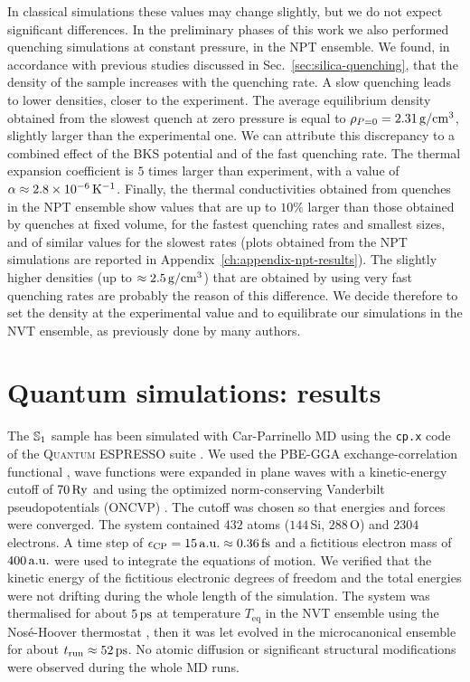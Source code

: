 In classical simulations these values may change slightly, but we do not expect significant differences. 
In the preliminary phases of this work we also performed quenching simulations at constant pressure, in the NPT ensemble. 
We found, in accordance with previous studies discussed in Sec.~\ref{sec:silica-quenching}, that the density of the sample increases with the quenching rate. A slow quenching leads to lower densities, closer to the experiment. The average equilibrium density obtained from the slowest quench at zero pressure is equal to $\rho_{P=0}=2.31\,\mathrm{g/cm^3}$, slightly larger than the experimental one. We can attribute this discrepancy to a combined effect of the BKS potential and of the fast quenching rate. 
The thermal expansion coefficient is $5$ times larger than experiment, with a value of $\alpha\approx 2.8\times 10^{-6} \,\mathrm{K^{-1}}$. 
Finally, the thermal conductivities obtained from quenches in the NPT ensemble show values that are up to $10\%$ larger than those obtained by quenches at fixed volume, for the fastest quenching rates and smallest sizes, and of similar values for the slowest rates (plots obtained from the NPT simulations are reported in Appendix~\ref{ch:appendix-npt-results}). 
The slightly higher densities (up to $\approx 2.5\,\mathrm{g/cm^3}$) that are obtained by using very fast quenching rates are probably the reason of this difference. 
We decide therefore to set the density at the experimental value and to equilibrate our simulations in the NVT ensemble, as previously done by many authors.


\section{Quantum simulations: results}  \label{sec:results-quantum}
The $\S1$ sample has been simulated with Car-Parrinello MD using the \texttt{cp.x} code of the \textsc{Quantum ESPRESSO} suite \cite{Giannozzi2009,Giannozzi2017}. 
We used the PBE-GGA exchange-correlation functional \cite{Perdew1996}, wave functions were expanded in plane waves with a kinetic-energy cutoff of $70\,\mathrm{Ry}$ and using the optimized norm-conserving Vanderbilt pseudopotentials (ONCVP) \cite{Schlipf2015,Hamann2013}. The cutoff was chosen so that energies and forces were converged.
The system contained $432$ atoms ($144\,$Si, $288\,$O) and $2304$ electrons. A time step of $\epsilon_\textrm{CP} = 15\,\mathrm{a.u.} \approx 0.36\,\mathrm{fs}$ and a fictitious electron mass of $400\,\mathrm{a.u.}$ were used to integrate the equations of motion. 
We verified that the kinetic energy of the fictitious electronic degrees of freedom and the total energies were not drifting during the whole length of the simulation. 
The system was thermalised for about $5\,\mathrm{ps}$ at temperature $T_\mathrm{eq}$ in the NVT ensemble using the Nos\'e-Hoover thermostat \cite{Nose1984,Hoover1985}, then it was let evolved in the microcanonical ensemble for about $t_\mathrm{run}\approx 52\,\mathrm{ps}$. 
No atomic diffusion or significant structural modifications were observed during the whole \abinitio MD runs.


